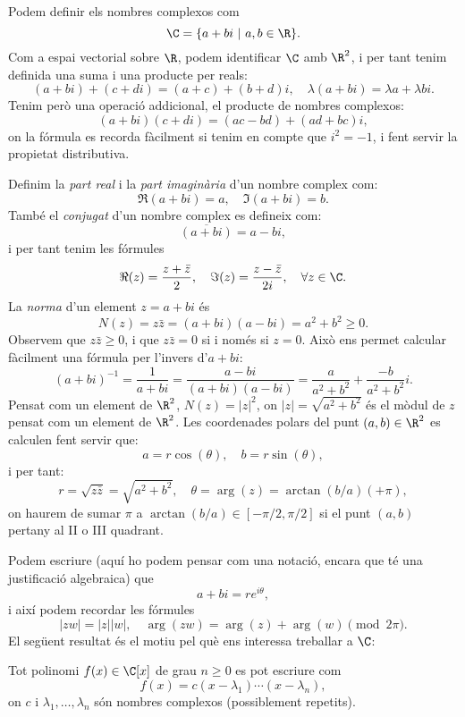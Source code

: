 \label{apenA}
Podem definir els nombres complexos com
\[
\C =\{a+bi ~|~ a,b\in\R\}.
\]
Com a espai vectorial sobre $\R$, podem identificar $\C$ amb $\R^2$, i per tant tenim definida una suma i una producte per reals:
\[
(a+bi) + (c+di) = (a+c) + (b+d)i, \quad \lambda(a+bi)=\lambda a + \lambda b i.
\]
Tenim però una operació addicional, el producte de nombres complexos:
\[
(a+bi)(c+di) = (ac-bd) + (ad+bc)i,
\]
on la fórmula es recorda fàcilment si tenim en compte que $i^2=-1$, i fent servir la propietat distributiva.

Definim la \emph{part real} i la \emph{part imaginària}  d'un nombre complex com:
\[
\Re(a+bi) = a,\quad \Im(a+bi) = b.
\]
També el \emph{conjugat} d'un nombre complex es defineix com:
\[
\overline{(a+bi)} = a-bi,
\]
i per tant tenim les fórmules
\[
\Re(z) = \frac{z+\bar z}{2},\quad \Im(z)=\frac{z-\bar z}{2i},\quad \forall z\in\C.
\]
La \emph{norma} d'un element $z=a+bi$ és
\[
N(z) = z\bar z = (a+bi)(a-bi) = a^2+b^2\geq 0.
\]
Observem que $z\bar z \geq 0$, i que $z\bar z = 0$ si i només si $z=0$. Això ens permet calcular fàcilment una fórmula per l'invers d'$a+bi$:
\[
(a+bi)^{-1} = \frac{1}{a+bi} = \frac{a-bi}{(a+bi)(a-bi)} = \frac{a}{a^2+b^2}+\frac{-b}{a^2+b^2}i.
\]
Pensat com un element de $\R^2$, $N(z)=|z|^2$, on $|z|=\sqrt{a^2+b^2}$ és el mòdul de $z$ pensat com un element de $\R^2$. Les coordenades polars del punt $(a,b)\in\R^2$ es calculen fent servir que:
\[
a = r\cos(\theta),\quad b = r\sin(\theta),
\]
i per tant:
\[
r = \sqrt{z\bar z}=\sqrt{a^2+b^2},\quad \theta = \arg(z) = \arctan(b/a) (+\pi),
\]
on haurem de sumar $\pi$ a $\arctan(b/a)\in[-\pi/2,\pi/2]$ si el punt $(a,b)$ pertany al II o III quadrant.

Podem escriure (aquí ho podem pensar com una notació, encara que té una justificació algebraica) que
\[
a+bi = re^{i\theta},
\]
i així podem recordar les fórmules
\[
|zw|=|z||w|,\quad \arg(zw)=\arg(z)+\arg(w)\pmod{2\pi}.
\]
El següent resultat és el motiu pel què ens interessa treballar a $\C$:

\begin{teorema}
Tot polinomi $f(x)\in \C[x]$ de grau $n\geq 0$ es pot escriure com
\[
f(x) = c (x-\lambda_1)\cdots (x-\lambda_n),
\]
on $c$ i $\lambda_1,\ldots,\lambda_n$ són nombres complexos (possiblement repetits).
\end{teorema}
